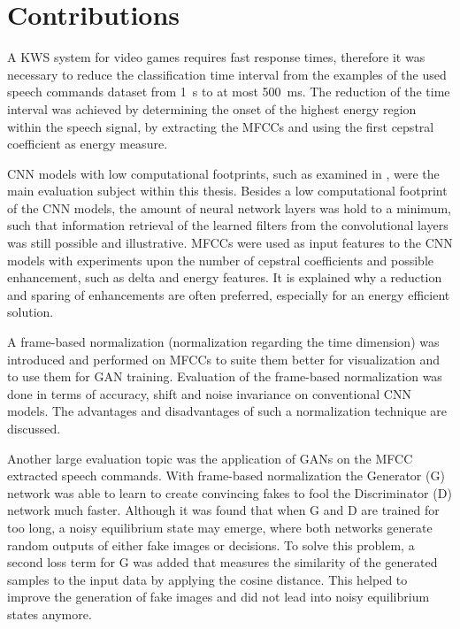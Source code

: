 
\section{Contributions}
A KWS system for video games requires fast response times, therefore it was necessary to reduce the classification time interval from the examples of the used speech commands dataset \cite{Warden2018} from \SI{1}{\second} to at most \SI{500}{\milli\second}.
The reduction of the time interval was achieved by determining the onset of the highest energy region within the speech signal, by extracting the MFCCs and using the first cepstral coefficient as energy measure.

CNN models with low computational footprints, such as examined in \cite{Sainath2015}, were the main evaluation subject within this thesis.
Besides a low computational footprint of the CNN models, the amount of neural network layers was hold to a minimum, such that information retrieval of the learned filters from the convolutional layers was still possible and illustrative.
MFCCs were used as input features to the CNN models with experiments upon the number of cepstral coefficients and possible enhancement, such as delta and energy features.
It is explained why a reduction and sparing of enhancements are often preferred, especially for an energy efficient solution.

A frame-based normalization (normalization regarding the time dimension) was introduced and performed on MFCCs to suite them better for visualization and to use them for GAN training.
Evaluation of the frame-based normalization was done in terms of accuracy, shift and noise invariance on conventional CNN models.
The advantages and disadvantages of such a normalization technique are discussed.

Another large evaluation topic was the application of GANs on the MFCC extracted speech commands. 
With frame-based normalization the Generator (G) network was able to learn to create convincing fakes to fool the Discriminator (D) network much faster.
Although it was found that when G and D are trained for too long, a noisy equilibrium state may emerge, where both networks generate random outputs of either fake images or decisions.
To solve this problem, a second loss term for G was added that measures the similarity of the generated samples to the input data by applying the cosine distance.
This helped to improve the generation of fake images and did not lead into noisy equilibrium states anymore.

